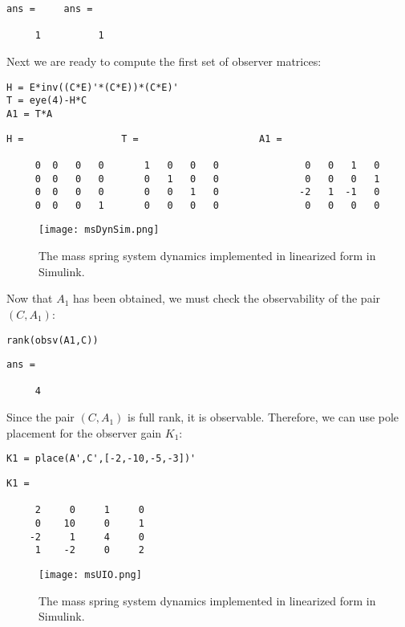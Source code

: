 \documentclass{amsart}
\theoremstyle{definition}
\theoremstyle{remark}
\numberwithin{equation}{section}
\begin{document}
        \color{lightgray} \begin{verbatim}
ans =     ans = 

     1          1
\end{verbatim} \color{black}
Next we are ready to compute the first set of observer matrices:
    \begin{verbatim}
H = E*inv((C*E)'*(C*E))*(C*E)'
T = eye(4)-H*C
A1 = T*A
\end{verbatim}

        \color{lightgray} \begin{verbatim}
H =                 T =                     A1 = 

     0  0   0   0       1   0   0   0               0   0   1   0
     0  0   0   0       0   1   0   0               0   0   0   1
     0  0   0   0       0   0   1   0              -2   1  -1   0
     0  0   0   1       0   0   0   0               0   0   0   0

\end{verbatim} \color{black}
\begin{figure}[H]
    \centering
    \texttt{[image: msDynSim.png]}
    \caption{The mass spring system dynamics implemented in linearized form in Simulink.}
    \label{fig:msDynSim}
\end{figure}

Now that $A_1$ has been obtained, we must check the observability of the pair $(C,A_1)$:
    \begin{verbatim}
rank(obsv(A1,C)) 
\end{verbatim}
        \color{lightgray} \begin{verbatim}
ans =

     4

\end{verbatim} \color{black}
Since the pair $(C,A_1)$ is full rank, it is observable.  Therefore, we can use pole placement for the observer gain $K_1$:
    \begin{verbatim}
K1 = place(A',C',[-2,-10,-5,-3])'
\end{verbatim}

        \color{lightgray} \begin{verbatim}
K1 =

     2     0     1     0
     0    10     0     1
    -2     1     4     0
     1    -2     0     2

\end{verbatim} \color{black}

\begin{figure}[H]
    \centering
    \texttt{[image: msUIO.png]}
    \caption{The mass spring system dynamics implemented in linearized form in Simulink.}
    \label{fig:msUIO}
\end{figure}
\end{document}
